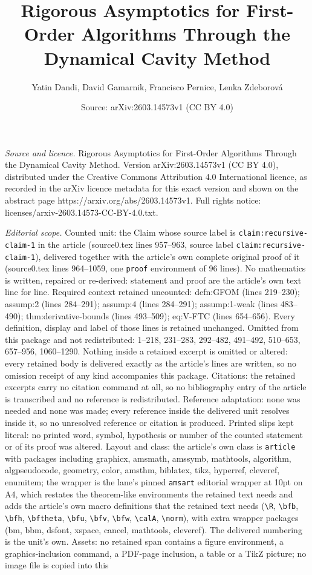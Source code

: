 \documentclass[10pt,a4paper]{amsart}
\title[Rigorous Asymptotics for First-Order Algorithms Through the ]{Rigorous Asymptotics for First-Order Algorithms Through the Dynamical Cavity Method}
\author{Yatin Dandi, David Gamarnik, Francisco Pernice, Lenka Zdeborov\'a}
\date{Source: arXiv:2603.14573v1 (CC BY 4.0)}
\begin{document}
\maketitle

\noindent\emph{Source and licence.} Rigorous Asymptotics for First-Order Algorithms Through the Dynamical Cavity Method. Version arXiv:2603.14573v1 (CC BY 4.0), distributed under the Creative Commons Attribution 4.0 International licence, as recorded in the arXiv licence metadata for this exact version and shown on the abstract page https://arxiv.org/abs/2603.14573v1. Full rights notice: licenses/arxiv-2603.14573-CC-BY-4.0.txt.\par\smallskip

\noindent\textit{Editorial scope.} Counted unit: the Claim whose source label is \texttt{claim:recursive-claim-1} in the article (source0.tex lines 957--963, source label \texttt{claim:recursive-claim-1}), delivered together with the article's own complete original proof of it (source0.tex lines 964--1059, one \texttt{proof} environment of 96 lines). No mathematics is written, repaired or re-derived: statement and proof are the article's own text line for line. Required context retained uncounted: defn:GFOM (lines 219--230); assump:2 (lines 284--291); assump:4 (lines 284--291); assump:1-weak (lines 483--490); thm:derivative-bounds (lines 493--509); eq:V-FTC (lines 654--656). Every definition, display and label of those lines is retained unchanged. Omitted from this package and not redistributed: 1--218, 231--283, 292--482, 491--492, 510--653, 657--956, 1060--1290. Nothing inside a retained excerpt is omitted or altered: every retained body is delivered exactly as the article's lines are written, so no omission receipt of any kind accompanies this package. Citations: the retained excerpts carry no citation command at all, so no bibliography entry of the article is transcribed and no reference is redistributed. Reference adaptation: none was needed and none was made; every reference inside the delivered unit resolves inside it, so no unresolved reference or citation is produced. Printed slips kept literal: no printed word, symbol, hypothesis or number of the counted statement or of its proof was altered. Layout and class: the article's own class is \texttt{article} with packages including graphicx, amsmath, amssymb, mathtools, algorithm, algpseudocode, geometry, color, amsthm, biblatex, tikz, hyperref, cleveref, enumitem; the wrapper is the lane's pinned \texttt{amsart} editorial wrapper at 10pt on A4, which restates the theorem-like environments the retained text needs and adds the article's own macro definitions that the retained text needs (\texttt{\textbackslash R}, \texttt{\textbackslash bfb}, \texttt{\textbackslash bfh}, \texttt{\textbackslash bftheta}, \texttt{\textbackslash bfu}, \texttt{\textbackslash bfv}, \texttt{\textbackslash bfw}, \texttt{\textbackslash calA}, \texttt{\textbackslash norm}), with extra wrapper packages (bm, bbm, dsfont, xspace, cancel, mathtools, cleveref). The delivered numbering is the unit's own. Assets: no retained span contains a figure environment, a graphics-inclusion command, a PDF-page inclusion, a table or a TikZ picture; no image file is copied into this 
\end{document}
